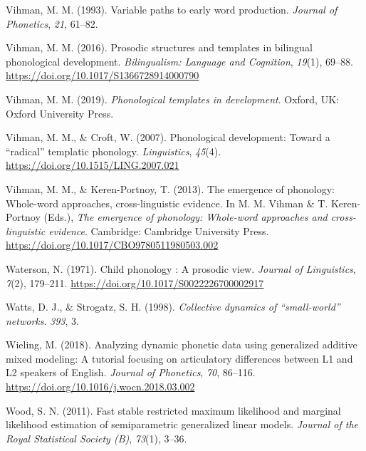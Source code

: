\documentclass[
  man]{apa6}
\newlength{\cslhangindent}
\newlength{\cslentryspacingunit} %
\newenvironment{CSLReferences}[2] %
 {%
  \setlength{\parindent}{0pt}
  \ifodd #1
  \let\oldpar\par
  \def\par{\hangindent=\cslhangindent\oldpar}
  \fi
  \setlength{\parskip}{#2\cslentryspacingunit}
 }%
 {}
\begin{document}
\begin{CSLReferences}{1}{0}
\leavevmode{}%
Vihman, M. M. (1993). Variable paths to early word production. \emph{Journal of Phonetics}, \emph{21}, 61--82.

\leavevmode{}%
Vihman, M. M. (2016). Prosodic structures and templates in bilingual phonological development. \emph{Bilingualism: Language and Cognition}, \emph{19}(1), 69--88. \url{https://doi.org/10.1017/S1366728914000790}

\leavevmode{}%
Vihman, M. M. (2019). \emph{Phonological templates in development}. Oxford, {UK}: Oxford University Press.

\leavevmode{}%
Vihman, M. M., \& Croft, W. (2007). Phonological development: Toward a {``radical''} templatic phonology. \emph{Linguistics}, \emph{45}(4). \url{https://doi.org/10.1515/LING.2007.021}

\leavevmode{}%
Vihman, M. M., \& Keren-Portnoy, T. (2013). The emergence of phonology: Whole-word approaches, cross-linguistic evidence. In M. M. Vihman \& T. Keren-Portnoy (Eds.), \emph{The emergence of phonology: Whole-word approaches and cross-linguistic evidence}. Cambridge: Cambridge University Press. \url{https://doi.org/10.1017/CBO9780511980503.002}

\leavevmode{}%
Waterson, N. (1971). Child phonology : A prosodic view. \emph{Journal of Linguistics}, \emph{7}(2), 179--211. \url{https://doi.org/10.1017/S0022226700002917}

\leavevmode{}%
Watts, D. J., \& Strogatz, S. H. (1998). \emph{Collective dynamics of {``small-world''} networks}. \emph{393}, 3.

\leavevmode{}%
Wieling, M. (2018). Analyzing dynamic phonetic data using generalized additive mixed modeling: {A} tutorial focusing on articulatory differences between {L1} and {L2} speakers of {English}. \emph{Journal of Phonetics}, \emph{70}, 86--116. \url{https://doi.org/10.1016/j.wocn.2018.03.002}

\leavevmode{}%
Wood, S. N. (2011). Fast stable restricted maximum likelihood and marginal likelihood estimation of semiparametric generalized linear models. \emph{Journal of the Royal Statistical Society (B)}, \emph{73}(1), 3--36.

\end{CSLReferences}


\clearpage
\renewcommand{\listfigurename}{Figure captions}
\end{document}

